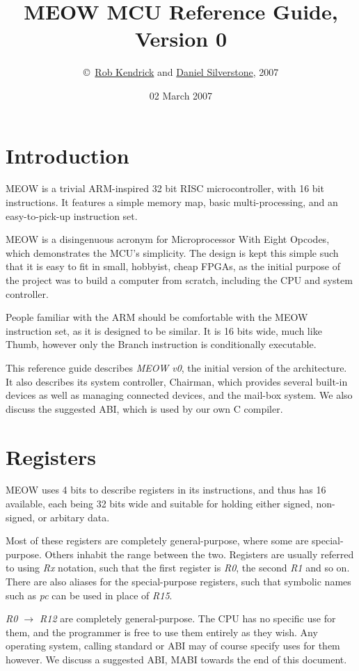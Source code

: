 \documentclass[a4paper,twoside,openany]{book}
\author{\copyright~\href{http://www.rjek.com/}{Rob Kendrick} and
         \href{http://www.digital-scurf.org}{Daniel Silverstone}, 2007}
\title{MEOW MCU Reference Guide, Version 0}
\date{02 March 2007}
\begin{document}
  \tableofcontents{}
  
  \chapter{Introduction}
    MEOW is a trivial ARM-inspired 32 bit RISC microcontroller, with 16 bit
    instructions.  It features a simple memory map, basic multi-processing,
    and an easy-to-pick-up instruction set.

    MEOW is a disingenuous acronym for Microprocessor With Eight Opcodes,
    which demonstrates the MCU's simplicity.  The design is kept this simple
    such that it is easy to fit in small, hobbyist, cheap FPGAs, as the
    initial purpose of the project was to build a computer from scratch,
    including the CPU and system controller.

    People familiar with the ARM should be comfortable with the MEOW
    instruction set, as it is designed to be similar.  It is 16 bits wide,
    much like Thumb, however only the Branch instruction is conditionally
    executable.
    
    This reference guide describes \emph{MEOW v0}, the initial version of
    the architecture.  It also describes its system controller, Chairman,
    which provides several built-in devices as well as managing connected
    devices, and the mail-box system.  We also discuss the suggested ABI,
    which is used by our own C compiler.
  
  \chapter{Registers}
    MEOW uses 4 bits to describe registers in its instructions, and thus has
    16 available, each being 32 bits wide and suitable for holding either
    signed, non-signed, or arbitary data.
    
    Most of these registers are completely general-purpose, where some are 
    special-purpose.  Others inhabit the range between the two.  Registers are
    usually referred to using \emph{Rx} notation, such that the first
    register is \emph{R0}, the second \emph{R1} and so on.  There are also
    aliases for the special-purpose registers, such that symbolic names
    such as \emph{pc} can be used in place of \emph{R15}.
    
    \emph{R0 $\to$ R12} are completely general-purpose.  The CPU has no
    specific use for them, and the programmer is free to use them entirely as
    they wish.  Any operating system, calling standard or ABI may of course
    specify uses for them however.  We discuss a suggested ABI, MABI towards
    the end of this document.
    
\end{document}
